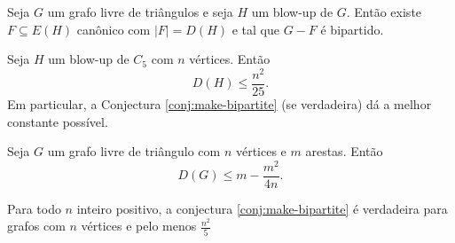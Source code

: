 \begin{theorem}[Simetrização]
  Seja $G$ um grafo livre de triângulos e seja $H$ um blow-up de $G$.
  Então existe $F \subseteq E(H)$ canônico com $|F|=D(H)$ e tal que $G-F$ é bipartido.
\end{theorem}

\begin{corollary}
  Seja $H$ um blow-up de $C_5$ com $n$ vértices.
  Então \[ D(H) \leq \frac{n^2}{25}. \]
  Em particular, a Conjectura \ref{conj:make-bipartite} (se verdadeira) dá a melhor constante possível.
\end{corollary}

\begin{theorem}
  Seja $G$ um grafo livre de triângulo com $n$ vértices e $m$ arestas.
  Então \[ D(G) \leq m-\frac{m^2}{4n}. \]
\end{theorem}

\begin{corollary} \label{cor:n2/5}
  Para todo $n$ inteiro positivo, a conjectura \ref{conj:make-bipartite}
  é verdadeira para grafos com $n$ vértices e pelo menos $\frac{n^2}{5}$
\end{corollary}

